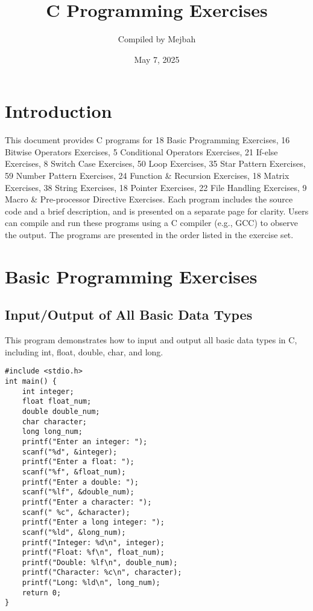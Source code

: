 \documentclass[a4paper,12pt]{article}
\title{C Programming Exercises}
\author{Compiled by Mejbah}
\date{May 7, 2025}
\begin{document}
\maketitle

\tableofcontents
\newpage

\section{Introduction}
This document provides C programs for 18 Basic Programming Exercises, 16 Bitwise Operators Exercises, 5 Conditional Operators Exercises, 21 If-else Exercises, 8 Switch Case Exercises, 50 Loop Exercises, 35 Star Pattern Exercises, 59 Number Pattern Exercises, 24 Function & Recursion Exercises, 18 Matrix Exercises, 38 String Exercises, 18 Pointer Exercises, 22 File Handling Exercises, 9 Macro & Pre-processor Directive Exercises. Each program includes the source code and a brief description, and is presented on a separate page for clarity. Users can compile and run these programs using a C compiler (e.g., GCC) to observe the output. The programs are presented in the order listed in the exercise set.

\newpage

\section{Basic Programming Exercises}

\subsection{Input/Output of All Basic Data Types}
This program demonstrates how to input and output all basic data types in C, including int, float, double, char, and long.

\begin{lstlisting}[caption={Input/Output of All Basic Data Types}]
#include <stdio.h>
int main() {
    int integer;
    float float_num;
    double double_num;
    char character;
    long long_num;
    printf("Enter an integer: ");
    scanf("%d", &integer);
    printf("Enter a float: ");
    scanf("%f", &float_num);
    printf("Enter a double: ");
    scanf("%lf", &double_num);
    printf("Enter a character: ");
    scanf(" %c", &character);
    printf("Enter a long integer: ");
    scanf("%ld", &long_num);
    printf("Integer: %d\n", integer);
    printf("Float: %f\n", float_num);
    printf("Double: %lf\n", double_num);
    printf("Character: %c\n", character);
    printf("Long: %ld\n", long_num);
    return 0;
}
\end{lstlisting}
\end{document}
